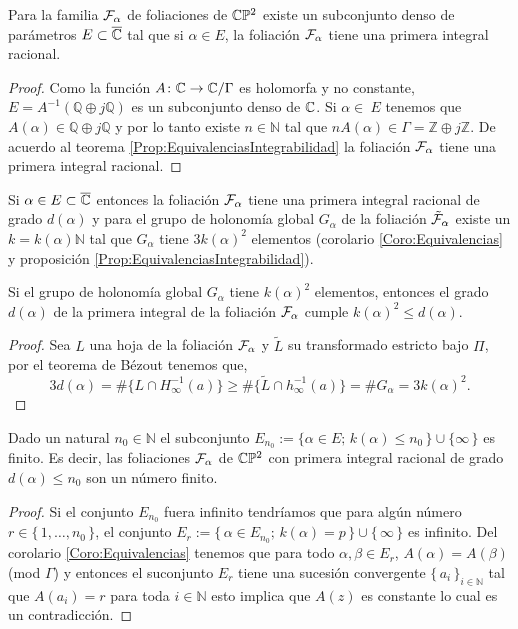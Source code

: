 \begin{Teorema}
\label{Teo:DensidadPrimerasIntegrales}
Para la familia $\mathcal{F}_{\alpha}$ de foliaciones de $\mathbb{C}\mathbb{P}^2$ existe un subconjunto denso de parámetros $E\subset\overline{\mathbb{C}}$ tal que si $\alpha\in E$, la foliación $\mathcal{F}_{\alpha}$ tiene una primera integral racional.
\end{Teorema}
\begin{proof}
Como la función $A\colon\mathbb{C}\rightarrow\mathbb{C}/\Gamma$ es holomorfa y no constante, $E=A^{-1}(\mathbb{Q}\oplus j\mathbb{Q})$ es un subconjunto denso de $\mathbb{C}$. Si $\alpha\in\ E$ tenemos que $A(\alpha)\in\mathbb{Q}\oplus j\mathbb{Q}$ y por lo tanto existe $n\in\mathbb{N}$ tal que $nA(\alpha)\in\Gamma=\mathbb{Z}\oplus j\mathbb{Z}$. De acuerdo al teorema \ref{Prop:EquivalenciasIntegrabilidad} la foliación $\mathcal{F}_{\alpha}$ tiene una primera integral racional.
\end{proof}

Si $\alpha\in E\subset\overline{\mathbb{C}}$ entonces la foliación $\mathcal{F}_{\alpha}$ tiene una primera integral racional de grado $d(\alpha)$ y para el grupo de holonomía global $G_{\alpha}$ de la foliación $\tilde{\mathcal{F}}_{\alpha}$ existe un $k=k(\alpha)\mathbb{N}$ tal que  $G_{\alpha}$ tiene $3k(\alpha)^{2}$ elementos (corolario \ref{Coro:Equivalencias} y proposición \ref{Prop:EquivalenciasIntegrabilidad}).

\begin{Lema}
\label{Lema:Cota}
Si el grupo de holonomía global $G_{\alpha}$ tiene $k(\alpha)^{2}$ elementos, entonces el grado $d(\alpha)$ de la primera integral de la foliación $\mathcal{F}_{\alpha}$ cumple $k(\alpha)^{2}\leq d(\alpha)$.
\end{Lema} 
\begin{proof}
Sea $L$ una hoja de la foliación $\mathcal{F}_{\alpha}$ y $\tilde{L}$ su transformado estricto bajo $\Pi$, por el teorema de Bézout tenemos que,
$$3d(\alpha)=\#\{L\cap H_{\infty}^{-1}(a)\}\geq\#\{\tilde{L}\cap h_{\infty}^{-1}(a)\}=\#G_{\alpha}=3k(\alpha)^{2}.$$
\end{proof}

\begin{Teorema}
\label{Teo:GradosGrandes}
Dado un natural $n_{0}\in\mathbb{N}$ el subconjunto $E_{n_{0}}:=\{\alpha\in E;\, k(\alpha)\leq n_{0}\, \}\cup\{\infty \, \}$ es finito. Es decir, las foliaciones $\mathcal{F}_{\alpha}$ de $\mathbb{C}\mathbb{P}^2$ con primera integral racional de grado $d(\alpha)\leq n_{0}$ son un número finito. 
\end{Teorema}
\begin{proof}
Si el conjunto $E_{n_{0}}$ fuera infinito tendríamos que para algún número $r\in\{\, 1,\ldots,n_{0} \, \}$, el conjunto $E_{r}:=\{\, \alpha\in E_{n_{0}};\, k(\alpha)=p \, \}\cup\{\, \infty\, \}$ es infinito. Del corolario \ref{Coro:Equivalencias} tenemos que para todo $\alpha,\beta\in E_{r}$, $A(\alpha)=A(\beta)$ (mod $\Gamma$) y entonces el suconjunto $E_{r}$ tiene una sucesión convergente $\{\, a_{i} \, \}_{i\in\mathbb{N}}$ tal que $A(a_{i})=r$ para toda $i\in\mathbb{N}$ esto implica que $A(z)$ es constante lo cual es un contradicción.
\end{proof}
